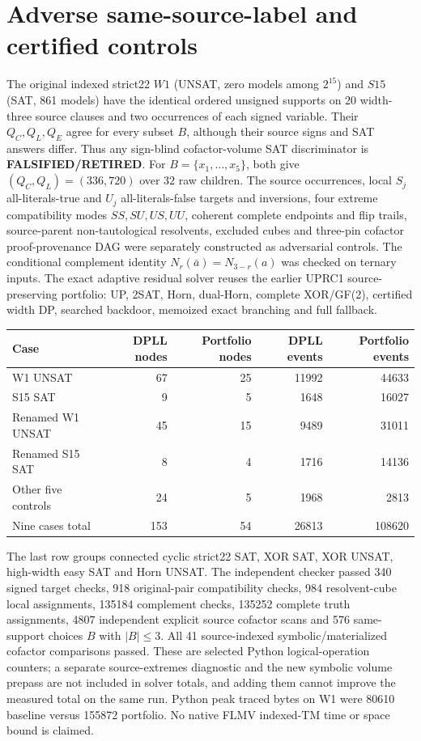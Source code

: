 \documentclass[11pt]{article}
\begin{document}
\section{Adverse same-source-label and certified controls}
The original indexed strict22 $W1$ (UNSAT, zero models among $2^{15}$)
and $S15$ (SAT, 861 models) have the identical ordered
unsigned supports on 20 width-three source clauses and two
occurrences of each signed variable. Their $Q_C,Q_L,Q_E$ agree
for every subset $B$, although their source signs and SAT answers
differ. Thus any sign-blind cofactor-volume SAT discriminator is
\textbf{FALSIFIED/RETIRED}.
For $B=\{x_1,\dots,x_5\}$, both give
$(Q_C,Q_L)=(336,720)$ over $32$ raw children.
The source occurrences, local $S_j$ all-literals-true and $U_j$
all-literals-false targets and inversions, four extreme compatibility
modes $SS,SU,US,UU$, coherent complete endpoints and flip trails,
source-parent non-tautological resolvents, excluded cubes and
three-pin cofactor proof-provenance DAG were separately constructed
as adversarial controls. The conditional complement identity
$N_r(\bar a)=N_{3-r}(a)$ was checked on ternary inputs.
The exact adaptive residual solver reuses the earlier UPRC1
source-preserving portfolio: UP, 2SAT, Horn, dual-Horn,
complete XOR/GF(2), certified width DP, searched backdoor,
memoized exact branching and full fallback.
\begin{center}
\begin{tabular}{lrrrr}
\toprule
Case & DPLL nodes & Portfolio nodes & DPLL events & Portfolio events\\\midrule
W1 UNSAT &67&25&11992&44633\\
S15 SAT &9&5&1648&16027\\
Renamed W1 UNSAT &45&15&9489&31011\\
Renamed S15 SAT &8&4&1716&14136\\
Other five controls &24&5&1968&2813\\\midrule
Nine cases total &153&54&26813&108620\\\bottomrule
\end{tabular}
\end{center}
The last row groups connected cyclic strict22 SAT, XOR SAT,
XOR UNSAT, high-width easy SAT and Horn UNSAT.
The independent checker passed 340 signed target checks,
918 original-pair compatibility checks,
984 resolvent-cube local assignments,
135184 complement checks, 135252 complete truth assignments,
4807 independent explicit source cofactor scans and 576
same-support choices $B$ with $|B|\le3$.
All 41 source-indexed symbolic/materialized cofactor comparisons passed.
These are selected Python logical-operation counters; a separate
source-extremes diagnostic and the new symbolic volume prepass are
not included in solver totals, and adding them cannot improve
the measured total on the same run. Python peak traced bytes
on W1 were 80610 baseline versus 155872 portfolio.
No native FLMV indexed-TM time or space bound is claimed.
\end{document}

